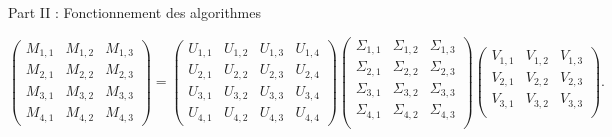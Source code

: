 \begin{frame}{Part II : Fonctionnement des algorithmes}

    \begin{equation*}
        \begin{pmatrix}
            M_{1, 1} & M_{1, 2} & M_{1, 3} \\
            M_{2, 1} & M_{2, 2} & M_{2, 3} \\
            M_{3, 1} & M_{3, 2} & M_{3, 3} \\
            M_{4, 1} & M_{4, 2} & M_{4, 3}
        \end{pmatrix}
        =
        \begin{pmatrix}
            U_{1, 1} & U_{1, 2} & U_{1, 3} & U_{1, 4} \\
            U_{2, 1} & U_{2, 2} & U_{2, 3} & U_{2, 4} \\
            U_{3, 1} & U_{3, 2} & U_{3, 3} & U_{3, 4} \\
            U_{4, 1} & U_{4, 2} & U_{4, 3} & U_{4, 4}
        \end{pmatrix}
        \begin{pmatrix}
            \Sigma_{1, 1} & \Sigma_{1, 2} & \Sigma_{1, 3} \\
            \Sigma_{2, 1} & \Sigma_{2, 2} & \Sigma_{2, 3} \\
            \Sigma_{3, 1} & \Sigma_{3, 2} & \Sigma_{3, 3} \\
            \Sigma_{4, 1} & \Sigma_{4, 2} & \Sigma_{4, 3} \\
        \end{pmatrix}
        \begin{pmatrix}
            V_{1, 1} & V_{1, 2} & V_{1, 3} \\
            V_{2, 1} & V_{2, 2} & V_{2, 3} \\
            V_{3, 1} & V_{3, 2} & V_{3, 3} \\
        \end{pmatrix}
        .
    \end{equation*}



\end{frame}
